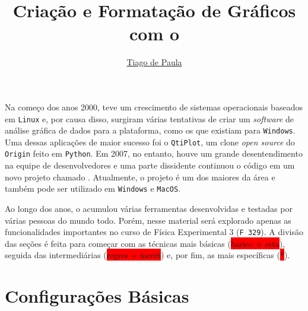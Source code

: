 \documentclass{article}
\title{Criação e Formatação de Gráficos com o}\softwarelogo
\author{\href{mailto:t187679@dac.unicamp.br}{Tiago de Paula}}
\date{}
\begin{document}
    \maketitle

    Na começo dos anos 2000, teve um crescimento de sistemas operacionais baseados em \texttt{Linux} e, por causa disso, surgiram várias tentativas de criar um \textit{software} de análise gráfica de dados para a plataforma, como os que existiam para \texttt{Windows}. Uma dessas aplicações de maior sucesso foi o \texttt{QtiPlot}, um clone \textit{open source} do \texttt{Origin} feito em \texttt{Python}. Em 2007, no entanto, houve um grande desentendimento na equipe de desenvolvedores e uma parte dissidente continuou o código em um novo projeto chamado \software. Atualmente, o projeto é um dos maiores da área e também pode ser utilizado em \texttt{Windows} e \texttt{MacOS}.

    Ao longo dos anos, o \software acumulou várias ferramentas desenvolvidas e testadas por várias pessoas do mundo todo. Porém, nesse material será explorado apenas as funcionalidades importantes no curso de Física Experimental 3 (\texttt{F 329}). A divisão das seções é feita para começar com as técnicas mais básicas (\colorbox{red}{basico + reta}), seguida das intermediárias (\colorbox{red}{regres + incert}) e, por fim, as mais específicas (\colorbox{red}{*}).

    \section{Configurações Básicas} \label{sec:basico}
        




\end{document}
